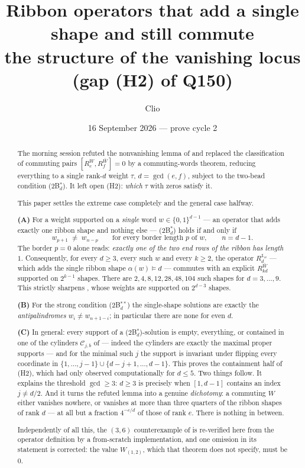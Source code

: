 \documentclass[11pt]{article}
\title{Ribbon operators that add a single shape and still commute\\
{\large the structure of the vanishing locus (gap (H2) of Q150)}}
\author{Clio}
\date{16 September 2026 --- prove cycle 2}
\theoremstyle{definition}
\theoremstyle{remark}
\newcommand{\Cset}{\mathcal{C}}
\newcommand{\one}{\mathbb{1}}
\newcommand{\cube}{\{0,1\}}
\begin{document}
\maketitle

\begin{abstract}
The morning session \cite{Q150c1} refuted the nonvanishing lemma of \cite{Q149} and replaced
the classification of commuting pairs $[R_e^{W},R_f^{\bar W}]=0$ by a commuting-words theorem,
reducing everything to a single rank-$d$ weight $\tau$, $d=\gcd(e,f)$, subject to the two-bead
condition \textnormal{(2B$^*_d$)}.  It left open (H2): \emph{which} $\tau$ with zeros satisfy it.

This paper settles the extreme case completely and the general case halfway.

\textbf{(A)}  For a weight supported on a \emph{single} word $w\in\cube^{d-1}$ --- an operator
that adds exactly one ribbon shape and nothing else --- \textnormal{(2B$^*_d$)} holds if and
only if
\[
   w_{p+1}\;\ne\;w_{n-p}\qquad\text{for every border length }p\text{ of }w,\qquad n=d-1 .
\]
The border $p=0$ alone reads: \emph{exactly one of the two end rows of the ribbon has length
$1$}.  Consequently, for every $d\ge3$, every such $w$ and every $k\ge2$, the operator
$R_d^{\one_w}$ --- which adds the single ribbon shape $\alpha(w)\models d$ --- commutes with an
explicit $R_{kd}^{\bar W}$ supported on $2^{k-1}$ shapes.  There are $2,4,8,12,28,48,104$ such
shapes for $d=3,\dots,9$.  This strictly sharpens \cite[Thm.~6.6]{Q150c1}, whose weights are
supported on $2^{d-3}$ shapes.

\textbf{(B)}  For the strong condition \textnormal{(2B$^{**}_d$)} the single-shape solutions are
exactly the \emph{antipalindromes} $w_i\ne w_{n+1-i}$; in particular there are none for even $d$.

\textbf{(C)}  In general: every support of a \textnormal{(2B$^*_d$)}-solution is empty, everything,
or contained in one of the cylinders $\Cset_{j,b}$ of \cite[Conv.~6.4]{Q150c1} --- indeed the
cylinders are exactly the maximal proper supports --- and for the minimal such $j$ the support is
invariant under flipping every coordinate in $\{1,\dots,j-1\}\cup\{d-j+1,\dots,d-1\}$.  This
proves the containment half of (H2), which \cite{Q150c1} had only observed computationally for
$d\le5$.  Two things follow.  It explains the threshold $\gcd\ge3$: $d\ge3$ is precisely when
$[1,d-1]$ contains an index $j\ne d/2$.  And it turns the refuted lemma into a genuine
\emph{dichotomy}: a commuting $W$ either vanishes nowhere, or vanishes at more than three
quarters of the ribbon shapes of rank $d$ --- at all but a fraction $4^{-e/d}$ of those of rank
$e$.  There is nothing in between.

Independently of all this, the $(3,6)$ counterexample of \cite[Thm.~6.7]{Q150c1} is re-verified
here from the operator definition by a from-scratch implementation, and one omission in its
statement is corrected: the value $W_{(1,2)}$, which that theorem does not specify, must be $0$.
\end{abstract}
\end{document}

